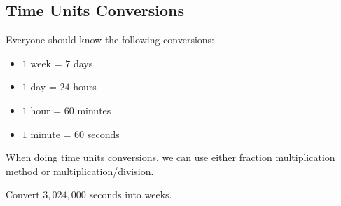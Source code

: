 \subsection{Time Units Conversions}
Everyone should know the following conversions:

\begin{itemize}
\item $1$ week = $7$ days
\item $1$ day = $24$ hours
\item $1$ hour = $60$ minutes
\item $1$ minute = $60$ seconds
\end{itemize}

When doing time units conversions, we can use either fraction multiplication method or multiplication/division.

\begin{myexample}
Convert $3,024,000$ seconds into weeks.
\end{myexample}
